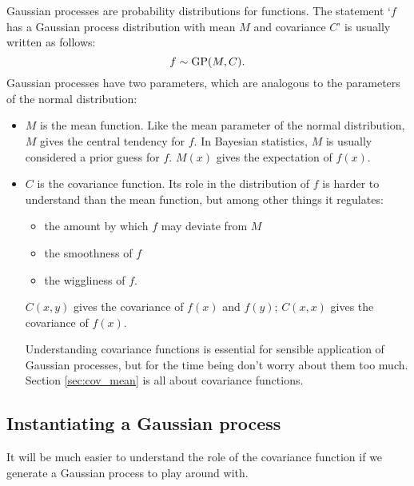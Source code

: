\documentclass{report}
\begin{document}
Gaussian processes are probability distributions for functions. The statement `$f$ has a Gaussian process distribution with mean $M$ and covariance $C$' is usually written as follows:
\begin{equation}
    f\sim\textup{GP}(M,C).
\end{equation}
Gaussian processes have two parameters, which are analogous to the parameters of the normal distribution:
\begin{itemize}
    \item $M$ is the mean function. Like the mean parameter of the normal distribution, $M$ gives the central tendency for $f$. In Bayesian statistics, $M$ is usually considered a prior guess for $f$. $M(x)$ gives the expectation of $f(x)$.
    \item $C$  is the covariance function. Its role in the distribution of $f$ is harder to understand than the mean function, but among other things it regulates:
    \begin{itemize}
        \item the amount by which $f$ may deviate from $M$
        \item the smoothness of $f$
        \item the wiggliness of $f$.
    \end{itemize}
    $C(x,y)$ gives the covariance of $f(x)$ and $f(y)$; $C(x,x)$ gives the covariance of $f(x)$.
    
    Understanding covariance functions is essential for sensible application of Gaussian processes, but for the time being don't worry about them too much. Section \ref{sec:cov_mean} is all about covariance functions.
\end{itemize}

\subsection{Instantiating a Gaussian process} 

It will be much easier to understand the role of the covariance function if we generate a Gaussian process to play around with. 
\end{document}
